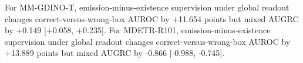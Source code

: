 For MM-GDINO-T, emission-minus-existence supervision under global readout changes correct-versus-wrong-box AUROC by +11.654 points but mixed AUGRC by +0.149 [+0.058, +0.235].
For MDETR-R101, emission-minus-existence supervision under global readout changes correct-versus-wrong-box AUROC by +13.889 points but mixed AUGRC by -0.866 [-0.988, -0.745].
